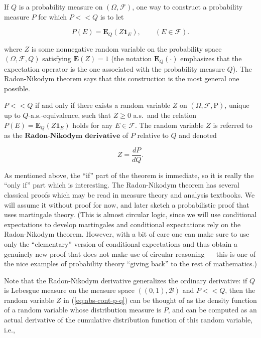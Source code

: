 \noindent If $Q$ is a probability measure on
$(\Omega, \mathcal{F})$, one way to construct a
probability measure $P$ for which $P<<Q$ is to let

\begin{equation*} \tag{5}\label{eq:abs-cont-p-q}
P(E) = \mathbf{E}_{Q}(Z \mathbf{1}_E), \qquad (E\in \mathcal{F}).
\end{equation*}

\noindent where $Z$ is some nonnegative random variable on the
probability space $(\Omega,\mathcal{F},Q)$ satisfying
$\mathbf{E}(Z)=1$ (the notation
$\mathbf{E}_{Q}(\cdot)$ emphasizes that the
expectation operator is the one associated with the
probability measure $Q$). The Radon-Nikodym theorem
says that this construction is the most general one
possible.

\begin{thm}
$P<<Q$ if and only if there exists a random variable
$Z$ on $(\Omega, \mathcal{F}, \mathrm{P})$, unique up
to $Q$-a.s.-equivalence, such that $Z\ge 0$ a.s.\ and
the relation $P(E) = \mathbf{E}_{Q} (Z \mathbf{1}_E)$
holds for any $E\in \mathcal{F}$. The random variable
$Z$ is referred to as the
$\textbf{Radon-Nikodym derivative}$ of $P$ relative
to $Q$ and denoted

\[
Z = \frac{dP}{dQ}.
\]

\end{thm}

\noindent As mentioned above, the ``if'' part of the theorem is
immediate, so it is really the ``only if'' part which
is interesting. The Radon-Nikodym theorem has several
classical proofs which may be read in measure theory
and analysis textbooks. We will assume it without
proof for now, and later sketch a probabilistic proof
that uses martingale theory. (This is almost circular
logic, since we will use conditional expectations to
develop martingales and conditional expectations rely
on the Radon-Nikodym theorem. However, with a bit of
care one can make sure to use only the ``elementary''
version of conditional expectations and thus obtain a
genuinely new proof that does not make use of circular
reasoning --- this is one of the nice examples of
probability theory ``giving back'' to the rest of
mathematics.)

Note that the Radon-Nikodym derivative generalizes
the ordinary derivative: if $Q$ is Lebesgue measure
on the measure space $((0,1),\mathcal{B})$ and $P<<Q$,
then the random variable $Z$ in (\ref{eq:abs-cont-p-q})
can be thought of as the density function of a random
variable whose distribution measure is $P$, and can
be computed as an actual derivative of the cumulative
distribution function of this random variable, i.e.,

